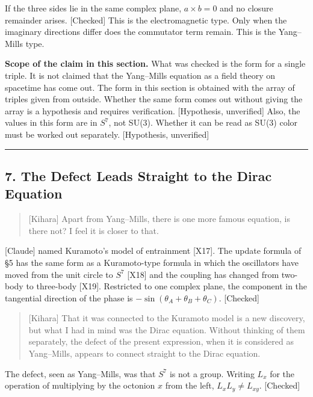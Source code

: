\documentclass[
  a4paper,
]{article}
\begin{document}
If the three sides lie in the same complex plane, \(a\times b = 0\) and
no closure remainder arises. {[}Checked{]} This is the electromagnetic
type. Only when the imaginary directions differ does the commutator term
remain. This is the Yang--Mills type.

\textbf{Scope of the claim in this section.} What was checked is the
form for a single triple. It is not claimed that the Yang--Mills
equation as a field theory on spacetime has come out. The form in this
section is obtained with the array of triples given from outside.
Whether the same form comes out without giving the array is a hypothesis
and requires verification. {[}Hypothesis, unverified{]} Also, the values
in this form are in \(S^7\), not SU(3). Whether it can be read as SU(3)
color must be worked out separately. {[}Hypothesis, unverified{]}

\begin{center}\rule{0.5\linewidth}{0.5pt}\end{center}

\subsection{7. The Defect Leads Straight to the Dirac
Equation}\label{the-defect-leads-straight-to-the-dirac-equation}

\begin{quote}
{[}Kihara{]} Apart from Yang--Mills, there is one more famous equation,
is there not? I feel it is closer to that.
\end{quote}

{[}Claude{]} named Kuramoto's model of entrainment {[}X17{]}. The update
formula of §5 has the same form as a Kuramoto-type formula in which the
oscillators have moved from the unit circle to \(S^7\) {[}X18{]} and the
coupling has changed from two-body to three-body {[}X19{]}. Restricted
to one complex plane, the component in the tangential direction of the
phase is \(-\sin(\theta_A+\theta_B+\theta_C)\). {[}Checked{]}

\begin{quote}
{[}Kihara{]} That it was connected to the Kuramoto model is a new
discovery, but what I had in mind was the Dirac equation. Without
thinking of them separately, the defect of the present expression, when
it is considered as Yang--Mills, appears to connect straight to the
Dirac equation.
\end{quote}

The defect, seen as Yang--Mills, was that \(S^7\) is not a group.
Writing \(L_x\) for the operation of multiplying by the octonion \(x\)
from the left, \(L_xL_y \ne L_{xy}\). {[}Checked{]}
\end{document}
